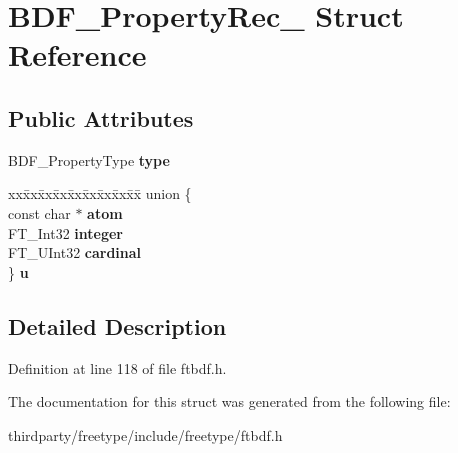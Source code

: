 \hypertarget{struct_b_d_f___property_rec__}{}\section{B\+D\+F\+\_\+\+Property\+Rec\+\_\+ Struct Reference}
\label{struct_b_d_f___property_rec__}
\subsection*{Public Attributes}
\begin{DoxyCompactItemize}
\item 
\mbox{\label{struct_b_d_f___property_rec___a88c19ee6f16bd1b36127f5f7d44a4e39}} 
B\+D\+F\+\_\+\+Property\+Type {\bfseries type}
\item 
\mbox{\label{struct_b_d_f___property_rec___ac3e024a1d0845c08337780f983bea4a8}} 
\begin{tabbing}
xx\=xx\=xx\=xx\=xx\=xx\=xx\=xx\=xx\=\kill
union \{\\
\>const char $\ast$ {\bfseries atom}\\
\>FT\_Int32 {\bfseries integer}\\
\>FT\_UInt32 {\bfseries cardinal}\\
\} {\bfseries u}\\

\end{tabbing}\end{DoxyCompactItemize}


\subsection{Detailed Description}


Definition at line 118 of file ftbdf.\+h.



The documentation for this struct was generated from the following file\+:\begin{DoxyCompactItemize}
\item 
thirdparty/freetype/include/freetype/ftbdf.\+h\end{DoxyCompactItemize}
